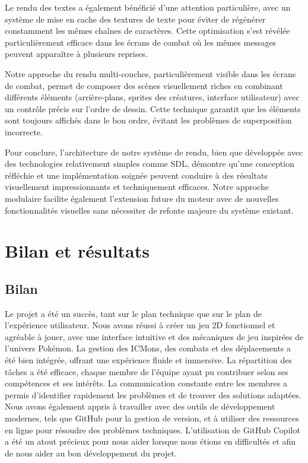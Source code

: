 \documentclass[12pt,a4paper, twoside]{article}
\begin{document}
Le rendu des textes a également bénéficié d'une attention particulière, avec un système de mise en cache des textures de texte pour éviter de régénérer constamment les mêmes chaînes de caractères. Cette optimisation s'est révélée particulièrement efficace dans les écrans de combat où les mêmes messages peuvent apparaître à plusieurs reprises.

Notre approche du rendu multi-couches, particulièrement visible dans les écrans de combat, permet de composer des scènes visuellement riches en combinant différents éléments (arrière-plans, sprites des créatures, interface utilisateur) avec un contrôle précis sur l'ordre de dessin. Cette technique garantit que les éléments sont toujours affichés dans le bon ordre, évitant les problèmes de superposition incorrecte.

Pour conclure, l'architecture de notre système de rendu, bien que développée avec des technologies relativement simples comme SDL, démontre qu'une conception réfléchie et une implémentation soignée peuvent conduire à des résultats visuellement impressionnants et techniquement efficaces. Notre approche modulaire facilite également l'extension future du moteur avec de nouvelles fonctionnalités visuelles sans nécessiter de refonte majeure du système existant.
\newpage
\section{Bilan et résultats}

\subsection{Bilan}
Le projet a été un succès, tant sur le plan technique que sur le plan de l'expérience utilisateur. Nous avons réussi à créer un jeu 2D fonctionnel et agréable à jouer, avec une interface intuitive et des mécaniques de jeu inspirées de l'univers Pokémon. La gestion des ICMons, des combats et des déplacements a été bien intégrée, offrant une expérience fluide et immersive.
La répartition des tâches a été efficace, chaque membre de l'équipe ayant pu contribuer selon ses compétences et ses intérêts. La communication constante entre les membres a permis d'identifier rapidement les problèmes et de trouver des solutions adaptées.
Nous avons également appris à travailler avec des outils de développement modernes, tels que GitHub pour la gestion de version, et à utiliser des ressources en ligne pour résoudre des problèmes techniques. L'utilisation de GitHub Copilot a été un atout précieux pour nous aider lorsque nous étions en difficultés et afin de nous aider au bon développement du projet.
\end{document}
